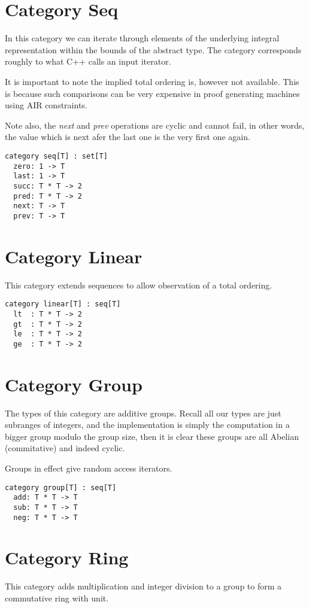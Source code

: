 \documentclass[oneside]{book}
\theoremstyle{plain}
\theoremstyle{definition}
\theoremstyle{plain}
\begin{document}
\section{Category Seq}
In this category we can iterate through elements of the underlying
integral representation within the bounds of the abstract type.
The category corresponds roughly to what C++ calls an input iterator.

It is important to note the implied total ordering is, however
not available. This is because such comparisons can be very
expensive in proof generating machines using AIR constraints.

Note also, the {\em next} and {\em prev} operations are cyclic and
cannot fail, in other words, the value which is next afer the last
one is the very first one again.

\begin{verbatim}
category seq[T] : set[T]
  zero: 1 -> T
  last: 1 -> T
  succ: T * T -> 2
  pred: T * T -> 2
  next: T -> T
  prev: T -> T
\end{verbatim}

\section{Category Linear}
This category extends sequences to allow observation of a total ordering.

\begin{verbatim}
category linear[T] : seq[T]
  lt  : T * T -> 2
  gt  : T * T -> 2
  le  : T * T -> 2
  ge  : T * T -> 2
\end{verbatim}

\section{Category Group}
The types of this category are additive groups. Recall all our types are
just subranges of integers, and the implementation is simply the
computation in a bigger group modulo the group size, then it is clear
these groups are all Abelian (commitative) and indeed cyclic.

Groups in effect give random access iterators.

\begin{verbatim}
category group[T] : seq[T]
  add: T * T -> T
  sub: T * T -> T
  neg: T * T -> T
\end{verbatim}

\section{Category Ring}
This category adds multiplication and integer division to a group
to form a commutative ring with unit.
\end{document}
